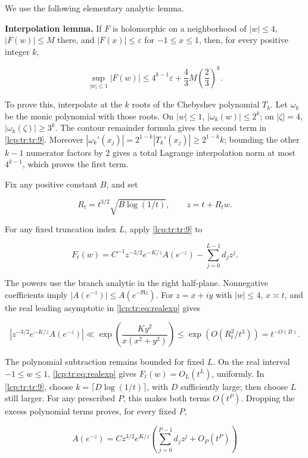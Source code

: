 \documentclass[11pt]{article}
\numberwithin{equation}{section}
\theoremstyle{definition}\newtheorem{definition}[theorem]{Definition}
\theoremstyle{remark}\newtheorem{remark}[theorem]{Remark}
\begin{document}
We use the following elementary analytic lemma.

\textbf{Interpolation lemma.} If \(F\) is holomorphic on a neighborhood
of \(|w|\le4\), \(|F(w)|\le M\) there, and \(|F(x)|\le\varepsilon\) for
\(-1\le x\le1\), then, for every positive integer \(k\),

\begin{equation}\label{lcp:tr:tr:9}
\sup_{|w|\le1}|F(w)|\le4^{k-1}\varepsilon+\frac43M\left(\frac23\right)^k.
\end{equation}

To prove this, interpolate at the \(k\) roots of the Chebyshev
polynomial \(T_k\). Let \(\omega_k\) be the monic polynomial with those
roots. On \(|w|\le1\), \(|\omega_k(w)|\le2^k\); on \(|\zeta|=4\),
\(|\omega_k(\zeta)|\ge3^k\). The contour remainder formula gives the
second term in \eqref{lcp:tr:tr:9}. Moreover
\(|\omega_k'(x_j)|=2^{1-k}|T_k'(x_j)|\ge2^{1-k}k\); bounding the other
\(k-1\) numerator factors by 2 gives a total Lagrange interpolation norm
at most \(4^{k-1}\), which proves the first term.

Fix any positive constant \(B\), and set

\[
R_t=t^{3/2}\sqrt{B\log(1/t)},\qquad z=t+R_tw.
\]

For any fixed truncation index \(L\), apply \eqref{lcp:tr:tr:9} to

\[
F_t(w)=C^{-1}z^{-3/2}e^{-K/z}A(e^{-z})-\sum_{j=0}^{L-1}d_jz^j.
\]

The powers use the branch analytic in the right half-plane. Nonnegative
coefficients imply \(|A(e^{-z})|\le A(e^{-\Re z})\). For \(z=x+iy\) with
\(|w|\le4\), \(x\asymp t\), and the real leading asymptotic in
\eqref{lcp:tr:eq:realexp} gives

\begin{equation}\label{lcp:tr:tr:10}
|z^{-3/2}e^{-K/z}A(e^{-z})|
\ll\exp\left(\frac{Ky^2}{x(x^2+y^2)}\right)
\le\exp(O(R_t^2/t^3))=t^{-O(B)}.
\end{equation}

The polynomial subtraction remains bounded for fixed \(L\). On the real
interval \(-1\le w\le1\), \eqref{lcp:tr:eq:realexp} gives \(F_t(w)=O_L(t^L)\),
uniformly. In \eqref{lcp:tr:tr:9}, choose \(k=\lceil D\log(1/t)\rceil\), with
\(D\) sufficiently large; then choose \(L\) still larger. For any
prescribed \(P\), this makes both terms \(O(t^P)\). Dropping the excess
polynomial terms proves, for every fixed \(P\),

\begin{equation}\label{lcp:tr:tr:11}
A(e^{-z})=Cz^{3/2}e^{K/z}
\left(\sum_{j=0}^{P-1}d_jz^j+O_P(t^P)\right)
\end{equation}
\end{document}
